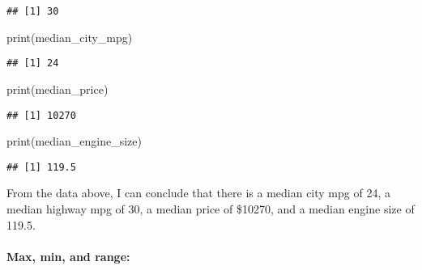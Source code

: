 \documentclass[
]{article}
\newenvironment{Shaded}{\begin{snugshade}}{\end{snugshade}}
\newcommand{\FunctionTok}[1]{\textcolor[rgb]{0.00,0.00,0.00}{#1}}
\newcommand{\NormalTok}[1]{#1}
\begin{document}
\begin{verbatim}
## [1] 30
\end{verbatim}

\begin{Shaded}
\begin{Highlighting}[]
\FunctionTok{print}\NormalTok{(median\_city\_mpg)}
\end{Highlighting}
\end{Shaded}

\begin{verbatim}
## [1] 24
\end{verbatim}

\begin{Shaded}
\begin{Highlighting}[]
\FunctionTok{print}\NormalTok{(median\_price)}
\end{Highlighting}
\end{Shaded}

\begin{verbatim}
## [1] 10270
\end{verbatim}

\begin{Shaded}
\begin{Highlighting}[]
\FunctionTok{print}\NormalTok{(median\_engine\_size)}
\end{Highlighting}
\end{Shaded}

\begin{verbatim}
## [1] 119.5
\end{verbatim}

From the data above, I can conclude that there is a median city mpg of
24, a median highway mpg of 30, a median price of \$10270, and a median
engine size of 119.5.\n

\hypertarget{max-min-and-range}{%
\paragraph{Max, min, and range:}\label{max-min-and-range}}
\end{document}
